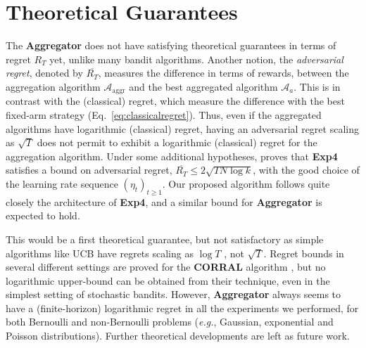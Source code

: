 \documentclass[conference]{IEEEtran}
\theoremstyle{plain}  %
\newcommand{\eg}{\emph{e.g.}}
\newcommand{\Aggr}[0]{\textbf{Aggregator}}
\newcommand{\ExpQ}[0]{\textbf{Exp4}}
\newcommand{\CORRAL}[0]{\textbf{CORRAL}}
\newcommand{\Alg}[0]{\mathcal{A}}
\begin{document}





\section{Theoretical Guarantees}\label{sec:theory}

The \Aggr{} does not have satisfying theoretical guarantees in terms of regret $R_T$ yet, unlike many bandit algorithms.
%
Another notion, the \emph{adversarial regret}, denoted by $\overline{R_T}$,
measures the difference in terms of rewards,
between the aggregation algorithm $\Alg_{\mathrm{aggr}}$ and the best aggregated algorithm $\Alg_a$. This is in contrast with the (classical) regret, which measure the difference with the best fixed-arm strategy (Eq.~\eqref{eq:classicalregret}). Thus,  even if the aggregated algorithms have logarithmic (classical) regret, having an adversarial regret scaling as $\sqrt{T}$ does not permit to exhibit a logarithmic (classical) regret for the aggregation algorithm.
%
%
Under some additional hypotheses,
\cite[Theorem 4.2]{Bubeck12} proves that
\ExpQ{} satisfies a bound on adversarial regret, %
$\overline{R_T} \leq 2 \sqrt{T N \log{k}}$,
with the good choice of the learning rate sequence $(\eta_t)_{t \geq 1}$.
Our proposed algorithm follows quite closely the architecture of \ExpQ,
and a similar bound for \Aggr{} is expected to hold.
%

This would be a first theoretical guarantee, but not satisfactory as simple algorithms like UCB have regrets scaling as $\log{T}$ \cite{Auer02,Bubeck12}, not $\sqrt{T}$.
%
Regret bounds in several different settings are proved for the \CORRAL{} algorithm \cite{Agarwal16}, but no logarithmic upper-bound can be obtained from their technique, even in the simplest setting of stochastic bandits.
%
However, \Aggr{} always seems to have a (finite-horizon) logarithmic regret in all the experiments we performed,
for both Bernoulli and non-Bernoulli problems (\eg, Gaussian, exponential and Poisson distributions).
Further theoretical developments are left as future work.
\end{document}
